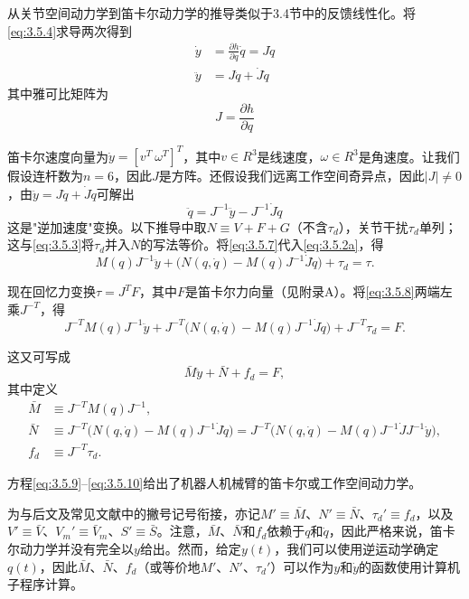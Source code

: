 \documentclass[12pt,a4paper]{ctexart}
\begin{document}
从关节空间动力学到笛卡尔动力学的推导类似于3.4节中的反馈线性化。将\eqref{eq:3.5.4}求导两次得到
\begin{align}
\dot{y} &= \frac{\partial h}{\partial q}\dot{q} = J\dot{q} \\
\ddot{y} &= J\ddot{q} + \dot{J}\dot{q}
\end{align}
其中雅可比矩阵为
\begin{equation}\label{eq:3.5.6}
J = \frac{\partial h}{\partial q}
\end{equation}

笛卡尔速度向量为$\dot{y} = [v^T \ \omega^T]^T$，其中$v \in R^3$是线速度，$\omega \in R^3$是角速度。让我们假设连杆数为$n = 6$，因此$J$是方阵。还假设我们远离工作空间奇异点，因此$|J| \neq 0$，由$\ddot{y}=J\ddot{q}+\dot{J}\dot{q}$可解出
\begin{equation}\label{eq:3.5.7}
\ddot{q} = J^{-1}\ddot{y} - J^{-1}\dot{J}\dot{q}
\end{equation}
这是"逆加速度"变换。以下推导中取$N\equiv V+F+G$（不含$\tau_d$），关节干扰$\tau_d$单列；这与\eqref{eq:3.5.3}将$\tau_d$并入$N$的写法等价。将\eqref{eq:3.5.7}代入\eqref{eq:3.5.2a}，得
\begin{equation}\label{eq:3.5.8}
M(q)J^{-1}\ddot{y} + \bigl(N(q,\dot{q}) - M(q)J^{-1}\dot{J}\dot{q}\bigr) + \tau_d = \tau.
\end{equation}

现在回忆力变换$\tau = J^T F$，其中$F$是笛卡尔力向量（见附录A）。将\eqref{eq:3.5.8}两端左乘$J^{-T}$，得
\begin{equation}\label{eq:3.5.9}
J^{-T}M(q)J^{-1}\ddot{y} + J^{-T}\bigl(N(q,\dot{q}) - M(q)J^{-1}\dot{J}\dot{q}\bigr) + J^{-T}\tau_d = F.
\end{equation}

这又可写成
\begin{equation}\label{eq:3.5.10}
\bar{M}\ddot{y} + \bar{N} + f_d = F,
\end{equation}
其中定义
\begin{align}
\label{eq:3.5.11} \bar{M} &\equiv J^{-T}M(q)J^{-1}, \\
\label{eq:3.5.12} \bar{N} &\equiv J^{-T}\bigl(N(q,\dot{q}) - M(q)J^{-1}\dot{J}\dot{q}\bigr) = J^{-T}\bigl(N(q,\dot{q}) - M(q)J^{-1}\dot{J}J^{-1}\dot{y}\bigr), \\
\label{eq:3.5.13} f_d &\equiv J^{-T}\tau_d.
\end{align}

方程\eqref{eq:3.5.9}--\eqref{eq:3.5.10}给出了机器人机械臂的笛卡尔或工作空间动力学。

为与后文及常见文献中的撇号记号衔接，亦记$M'\equiv\bar{M}$、$N'\equiv\bar{N}$、$\tau_d'\equiv f_d$，以及$V'\equiv\bar{V}$、$V_m'\equiv\bar{V}_m$、$S'\equiv\bar{S}$。注意，$\bar{M}$、$\bar{N}$和$f_d$依赖于$q$和$\dot{q}$，因此严格来说，笛卡尔动力学并没有完全以$y$给出。然而，给定$y(t)$，我们可以使用逆运动学确定$q(t)$，因此$\bar{M}$、$\bar{N}$、$f_d$（或等价地$M'$、$N'$、$\tau_d'$）可以作为$y$和$\dot{y}$的函数使用计算机子程序计算。
\end{document}
